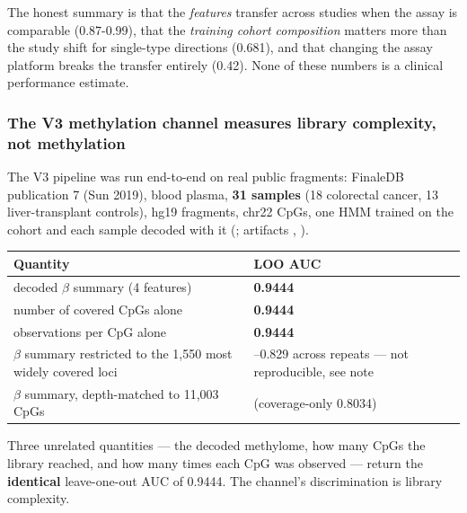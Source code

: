 \documentclass[11pt]{article}
\begin{document}
The honest summary is that the \textit{features} transfer across studies when the assay is comparable (0.87-0.99), that the \textit{training cohort composition} matters more than the study shift for single-type directions (0.681), and that changing the assay platform breaks the transfer entirely (0.42). None of these numbers is a clinical performance estimate.

\subsubsection{The V3 methylation channel measures library complexity, not methylation}
The V3 pipeline was run end-to-end on real public fragments: FinaleDB publication 7 (Sun 2019), blood plasma, \textbf{31 samples} (18 colorectal cancer, 13 liver-transplant controls), hg19 fragments, chr22 CpGs, one HMM trained on the cohort and each sample decoded with it (; artifacts , ).

\begin{table}[htbp]
\centering
\small
\begin{tabular}{>{\raggedright\arraybackslash}p{}>{\raggedright\arraybackslash}p{}}
\toprule
Quantity & LOO AUC \\
\midrule
decoded $\beta$ summary (4 features) & \textbf{0.9444} \\
number of covered CpGs alone & \textbf{0.9444} \\
observations per CpG alone & \textbf{0.9444} \\
$\beta$ summary restricted to the 1,550 most widely covered loci & 0.803--0.829 across repeats --- not reproducible, see note \\
$\beta$ summary, depth-matched to 11,003 CpGs & 0.9444 (coverage-only 0.8034) \\
\bottomrule
\end{tabular}
\end{table}

Three unrelated quantities --- the decoded methylome, how many CpGs the library reached, and how many times each CpG was observed --- return the \textbf{identical} leave-one-out AUC of 0.9444. The channel's discrimination is library complexity.
\end{document}
